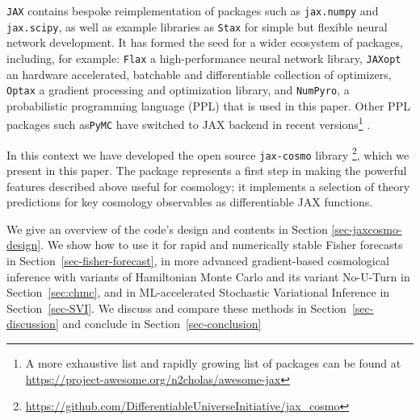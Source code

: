 \documentclass[twocolumn,twocolappendix,nofootinbib]{openjournal}
\newcommand{\numpyro}{\texttt{NumPyro}}
\begin{document}
\texttt{JAX} contains bespoke reimplementation of packages such as \texttt{jax.numpy} and \texttt{jax.scipy}, as well as example libraries as \texttt{Stax} for simple but flexible neural network development. It has formed the seed for a wider ecosystem of packages, including, for example: 
\texttt{Flax} \citep{flax2020github} a high-performance neural network library, \texttt{JAXopt} \citep{jaxopt_implicit_diff} an hardware accelerated, batchable and differentiable collection of optimizers, \texttt{Optax} \citep{optax2020github} a gradient processing and optimization library, and \numpyro \citep{phan2019composable,bingham2019pyro}, a probabilistic programming language (PPL) that is used in this paper. Other PPL packages such as\texttt{PyMC} \citep{Salvatier2016} have switched to JAX backend in recent versions\footnote{A more exhaustive list and rapidly growing list of packages can be found at \url{https://project-awesome.org/n2cholas/awesome-jax}}
.


In this context we have developed the open source \texttt{jax-cosmo} library \footnote{ \url{https://github.com/DifferentiableUniverseInitiative/jax_cosmo}}, which we present in this paper. The package represents a first step in making the powerful features described above useful for cosmology; it implements a selection of theory predictions for key cosmology observables as differentiable JAX functions.


We give an overview of the code's design and contents in Section \ref{sec-jaxcosmo-design}. We show how to use it for rapid and numerically stable Fisher forecasts in Section~\ref{sec-fisher-forecast}, in more advanced gradient-based cosmological inference with variants of Hamiltonian Monte Carlo and its variant No-U-Turn in Section~\ref{sec:chmc}, and in ML-accelerated Stochastic Variational Inference in Section~\ref{sec-SVI}. We discuss and compare these methods in Section~\ref{sec-discussion} and conclude in Section~\ref{sec-conclusion}
\end{document}
